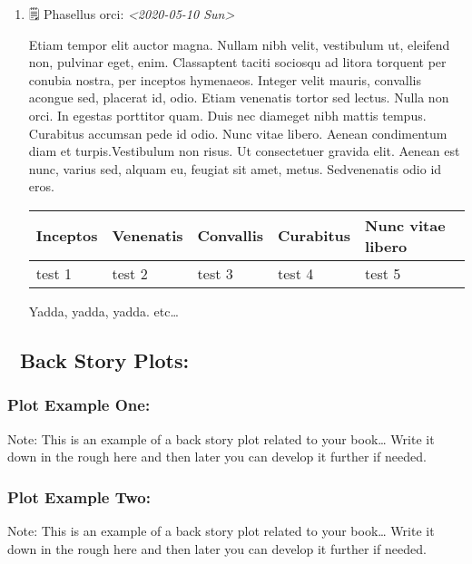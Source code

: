\documentclass[11pt]{article}
\begin{document}
\begin{enumerate}
\item 🗒 Phasellus orci: \textit{<2020-05-10 Sun>}
\label{sec:orgeb11b43}

Etiam tempor elit auctor magna. Nullam nibh velit, vestibulum ut, eleifend non, pulvinar eget, enim. Classaptent taciti sociosqu ad litora torquent per conubia nostra, per inceptos hymenaeos. Integer velit mauris, convallis acongue sed, placerat id, odio. Etiam venenatis tortor sed lectus. Nulla non orci. In egestas porttitor quam. Duis nec diameget nibh mattis tempus. Curabitus accumsan pede id odio. Nunc vitae libero. Aenean condimentum diam et turpis.Vestibulum non risus. Ut consectetuer gravida elit. Aenean est nunc, varius sed, alquam eu, feugiat sit amet, metus. Sedvenenatis odio id eros.

\begin{center}
\begin{tabular}{lllll}
\hline
Inceptos & Venenatis & Convallis & Curabitus & Nunc vitae libero\\
\hline
test 1 & test 2 & test 3 & test 4 & test 5\\
\hline
\end{tabular}
\end{center}

Yadda, yadda, yadda. etc\ldots{}
\end{enumerate}



\subsection{📒 Back Story Plots:}
\label{sec:org50afa94}

\subsubsection{Plot Example One:}
\label{sec:orge5526e2}

Note: This is an example of a back story plot related to your book\ldots{} Write it down in the rough here and then later you can develop it further if needed.

\subsubsection{Plot Example Two:}
\label{sec:orgf88871b}

Note: This is an example of a back story plot related to your book\ldots{} Write it down in the rough here and then later you can develop it further if needed.
\end{document}
